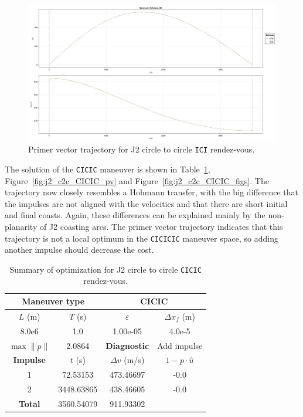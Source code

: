 \begin{figure}[htbp]
    \centering
    \includegraphics[width=\linewidth]{../results/j2/hohmann/ICI_primer_vector.png}
    \caption{Primer vector trajectory for J2 circle to circle \texttt{ICI} rendez-vous.}
    \label{fig:j2_c2c_ICI_pv}
\end{figure}

The solution of the \texttt{CICIC} maneuver is shown in Table~\ref{tab:j2_c2c_CICIC_tab}, Figure~\ref{fig:j2_c2c_CICIC_pv} and Figure~\ref{fig:j2_c2c_CICIC_figs}. The trajectory now closely resembles a Hohmann transfer, with the big difference that the impulses are not aligned with the velocities and that there are short initial and final coasts. Again, these differences can be explained mainly by the non-planarity of J2 coasting arcs. The primer vector trajectory indicates that this trajectory is not a local optimum in the \texttt{CICICIC} maneuver space, so adding another impulse should decrease the cost.

\begin{table}[htpb]
    \centering
    \begin{tabular}{cccc} \toprule
    \multicolumn{2}{c}{\textbf{Maneuver type}} & \multicolumn{2}{c}{CICIC} \\ \midrule
    \(L\) (m) & \(T\) (s) & \(\varepsilon\) & \(\Delta x_{f}\) (m)    \\ \midrule
    8.0e6          & 1.0          & 1.00e-05                & 4.0e-5                        \\ \midrule
    \(\max \lVert p \rVert\) & 2.0864     & \textbf{Diagnostic}   & Add impulse        \\ \midrule
    \textbf{Impulse} & \(t\) (s) & \(\Delta v\) (m/s) & \(1 - p \cdot \hat{u}\) \\ \midrule
    1                 & 72.53153          & 473.46697             & -0.0                    \\
    2                 & 3448.63865          & 438.46605             & -0.0                    \\\midrule
    \textbf{Total}   & 3560.54079          & 911.93302             &                     \\ \bottomrule   
    \end{tabular}
    \caption{Summary of optimization for J2 circle to circle \texttt{CICIC} rendez-vous.}
    \label{tab:j2_c2c_CICIC_tab}
\end{table}

